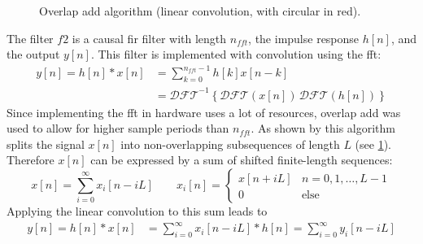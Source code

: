 \documentclass[12pt,a4paper,parskip=full,abstract=true,BCOR=10mm,twoside,open=right]{scrreprt}
\begin{document}
\begin{figure}[htb]
    \caption{Overlap add algorithm (linear convolution, with circular in red). }
    \label{fig:overlap_add}
\end{figure}
The filter $f2$ is a causal \gls{fir} filter with length $n_{fft}$, the impulse response $h[n]$, and the output $y[n]$. This filter is
implemented with convolution using the \gls{fft}:
\begin{equation}
    \begin{split}
     \label{eq:circ} y[n] = h[n] * x[n] & = \sum_{k=0}^{n_{fft}-1} h[k]x[n-k]\\
         & = \mathcal{DFT}^{-1}\left\{\mathcal{DFT}(x[n])\,\mathcal{DFT}(h[n])\right\}
    \end{split}
\end{equation}
Since implementing the \gls{fft} in hardware uses a lot of resources, overlap add
was used to allow for higher sample periods than $n_{fft}$. As shown by \cite{schaums_2011}
this algorithm splits the signal $x[n]$ into non-overlapping
subsequences of length $L$ (see \cref{fig:overlap_add}). Therefore $x[n]$ can
be expressed by a sum of shifted finite-length sequences:
\begin{equation}
    \label{eq:sum_seq} x[n] = \sum_{i=0}^{\infty} x_i[n-iL] \qquad x_i[n] =\begin{cases}
        x[n+iL] & n = 0, 1, \ldots, L-1\\
        0 & \text{else} \end{cases}
\end{equation}
Applying the linear convolution to this sum leads to
\begin{equation}
    \begin{split}\label{eq:overlap_add_sum}
        y[n] = h[n] * x[n] & = \sum_{i=0}^{\infty} x_i[n-iL] * h[n] = \sum_{i=0}^{\infty} y_i[n-iL]
    \end{split}
\end{equation}
\end{document}
